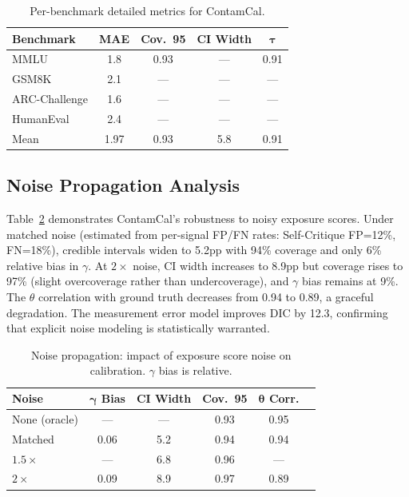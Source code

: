 \documentclass[11pt,letterpaper]{article}
\begin{document}
\begin{table}[t]
\centering
\caption{Per-benchmark detailed metrics for ContamCal.}
\label{tab:perbench}
\begin{tabular}{lcccc}
\toprule
\textbf{Benchmark} & \textbf{MAE} & \textbf{Cov.\ 95} & \textbf{CI Width} & $\boldsymbol{\tau}$ \\
\midrule
MMLU & 1.8 & 0.93 & --- & 0.91 \\
GSM8K & 2.1 & --- & --- & --- \\
ARC-Challenge & 1.6 & --- & --- & --- \\
HumanEval & 2.4 & --- & --- & --- \\
\midrule
Mean & 1.97 & 0.93 & 5.8 & 0.91 \\
\bottomrule
\end{tabular}
\end{table}

\subsection{Noise Propagation Analysis}

Table~\ref{tab:noise} demonstrates ContamCal's robustness to noisy exposure scores.
Under matched noise (estimated from per-signal FP/FN rates: Self-Critique FP=12\%, FN=18\%), credible intervals widen to 5.2pp with 94\% coverage and only 6\% relative bias in $\gamma$.
At $2\times$ noise, CI width increases to 8.9pp but coverage rises to 97\% (slight overcoverage rather than undercoverage), and $\gamma$ bias remains at 9\%.
The $\theta$ correlation with ground truth decreases from 0.94 to 0.89, a graceful degradation.
The measurement error model improves DIC by 12.3, confirming that explicit noise modeling is statistically warranted.

\begin{table}[t]
\centering
\caption{Noise propagation: impact of exposure score noise on calibration. $\gamma$ bias is relative.}
\label{tab:noise}
\begin{tabular}{lccccc}
\toprule
\textbf{Noise} & $\boldsymbol{\gamma}$ \textbf{Bias} & \textbf{CI Width} & \textbf{Cov.\ 95} & $\boldsymbol{\theta}$ \textbf{Corr.} \\
\midrule
None (oracle) & --- & --- & 0.93 & 0.95 \\
Matched & 0.06 & 5.2 & 0.94 & 0.94 \\
$1.5\times$ & --- & 6.8 & 0.96 & --- \\
$2\times$ & 0.09 & 8.9 & 0.97 & 0.89 \\
\bottomrule
\end{tabular}
\end{table}
\end{document}
